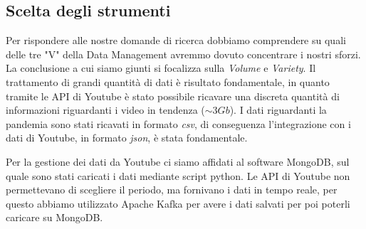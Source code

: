 \subsection*{Scelta degli strumenti}
Per rispondere alle nostre domande di ricerca dobbiamo comprendere su quali delle tre "V" della Data Management avremmo dovuto concentrare i nostri sforzi. La conclusione a cui siamo giunti si focalizza sulla \textit{Volume} e \textit{Variety}. Il trattamento di grandi quantità di dati è risultato fondamentale, in quanto tramite le API di Youtube è stato possibile ricavare una discreta quantità di informazioni riguardanti i video in tendenza ($\sim 3Gb$). I dati riguardanti la pandemia sono stati ricavati in formato \textit{csv}, di conseguenza l'integrazione con i dati di Youtube, in formato \textit{json}, è stata fondamentale.

Per la gestione dei dati da Youtube ci siamo affidati al software MongoDB, sul quale sono stati caricati i dati mediante script python. Le API di Youtube non permettevano di scegliere il periodo, ma fornivano i dati in tempo reale, per questo abbiamo utilizzato Apache Kafka per avere i dati salvati per poi poterli caricare su MongoDB.
 
